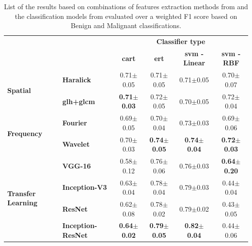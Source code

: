 \documentclass[journal,article,accept,moreauthors,pdftex, applsci]{Definitions/mdpi}
\begin{document}
\begin{table}[h]
    \centering
    \begin{tabular}{llcccc}
    \multicolumn{2}{c}{}                                                        &\multicolumn{4}{c}{\textbf{Classifier type}}                                                       \\ \cline{3-6}
    \multicolumn{2}{c}{}                                                        &\textbf{\ac{cart}}     &\textbf{\ac{ert}}      &\textbf{\ac{svm} - Linear} &\textbf{\ac{svm} - RBF}\\ \hline
    \multirow{2}{*}{\textbf{Spatial}}           &\textbf{Haralick}              &0.71$\pm$0.05          &0.71$\pm$0.05          &0.71$\pm$0.05              &0.70$\pm$0.07          \\ \cline{2-6}
                                                &\textbf{\ac{glh}+\ac{glcm}}    &\textbf{0.71$\pm$0.03} &0.72$\pm$0.05          &0.70$\pm$0.05              &0.72$\pm$0.04          \\ \hline
    \multirow{2}{*}{\textbf{Frequency}}         &\textbf{Fourier}               &0.69$\pm$0.05          &0.70$\pm$0.04          &0.73$\pm$0.03              &0.69$\pm$0.06          \\ \cline{2-6}
                                                &\textbf{Wavelet}               &0.70$\pm$0.03          &\textbf{0.74$\pm$0.05} &\textbf{0.74$\pm$0.04}     &\textbf{0.72$\pm$0.03} \\ \hline
    \multirow{4}{*}{\textbf{Transfer Learning}} &\textbf{VGG-16}                &0.58$\pm$0.12          &0.76$\pm$0.06          &0.76$\pm$0.03              &\textbf{0.64$\pm$0.20} \\ \cline{2-6}
                                                &\textbf{Inception-V3}          &0.63$\pm$0.04          &0.78$\pm$0.04          &0.79$\pm$0.03              &0.44$\pm$0.04          \\ \cline{2-6}
                                                &\textbf{ResNet}                &0.62$\pm$0.08          &0.78$\pm$0.02          &0.79$\pm$0.02              &0.43$\pm$0.05          \\ \cline{2-6}
                                                &\textbf{Inception-ResNet}      &\textbf{0.64$\pm$0.02} &\textbf{0.79$\pm$0.05} &\textbf{0.82$\pm$0.04}     &0.44$\pm$0.06          \\ \hline
    \end{tabular}    
    \caption{List of the results based on combinations of features extraction methods from  and the classification models from  evaluated over a weighted F1 score based on Benign and Malignant classifications.}
    \label{tab:image_results}
\end{table}
\end{document}
